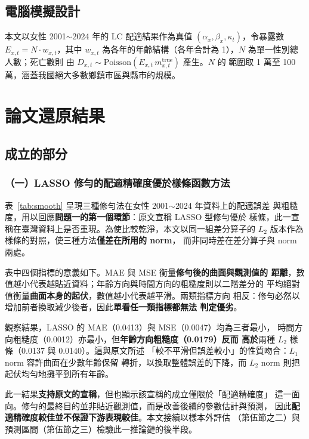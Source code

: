 \documentclass[UTF8, fontset=macnew, a4paper, 12pt]{ctexart}
\begin{document}
\subsection{電腦模擬設計}

本文以女性 2001$\sim$2024 年的 LC 配適結果作為真值
$(\alpha_x,\beta_x,\kappa_t)$，令暴露數 $E_{x,t}=N\cdot w_{x,t}$，其中
$w_{x,t}$ 為各年的年齡結構（各年合計為 1），$N$ 為單一性別總人數；死亡數則
由 $D_{x,t}\sim\text{Poisson}(E_{x,t}\,m^{\text{true}}_{x,t})$ 產生。$N$ 的
範圍取 1 萬至 100 萬，涵蓋我國絕大多數鄉鎮市區與縣市的規模。

\section{論文還原結果}

\subsection{成立的部分}

\subsubsection{（一）LASSO 修勻的配適精確度優於樣條函數方法}

表~\ref{tab:smooth} 呈現三種修勻法在女性 2001$\sim$2024 年資料上的配適誤差
與粗糙度，用以回應\textbf{問題一的第一個環節}：原文宣稱 LASSO 型修勻優於
樣條，此一宣稱在臺灣資料上是否重現。為使比較乾淨，本文以同一組差分算子的
$L_2$ 版本作為樣條的對照，使三種方法\textbf{僅差在所用的 norm}，
而非同時差在差分算子與 norm 兩處。

表中四個指標的意義如下。MAE 與 MSE 衡量\textbf{修勻後的曲面與觀測值的
距離}，數值越小代表越貼近資料；年齡方向與時間方向的粗糙度則以二階差分的
平均絕對值衡量\textbf{曲面本身的起伏}，數值越小代表越平滑。兩類指標方向
相反：修勻必然以增加前者換取減少後者，因此\textbf{單看任一類指標都無法
判定優劣}。

觀察結果，LASSO 的 MAE（0.0413）與 MSE（0.0047）均為三者最小，
時間方向粗糙度（0.0012）亦最小，但\textbf{年齡方向粗糙度（0.0179）反而
高於}兩種 $L_2$ 樣條（0.0137 與 0.0140）。這與原文所述
「較不平滑但誤差較小」的性質吻合：$L_1$ norm 容許曲面在少數年齡保留
轉折，以換取整體誤差的下降，而 $L_2$ norm 則把起伏均勻地攤平到所有年齡。

此一結果\textbf{支持原文的宣稱}，但也顯示該宣稱的成立僅限於「配適精確度」
這一面向。修勻的最終目的並非貼近觀測值，而是改善後續的參數估計與預測，
因此\textbf{配適精確度較佳並不保證下游表現較佳}。本文接續以樣本外評估
（第伍節之二）與預測區間（第伍節之三）檢驗此一推論鏈的後半段。
\end{document}

